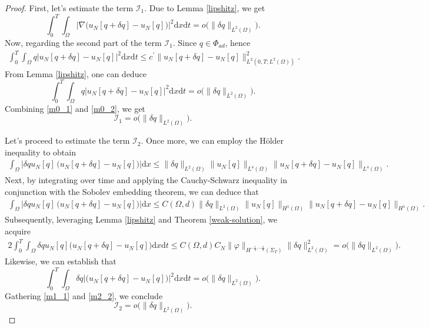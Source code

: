 \documentclass[a4paper,12pt,reqno,natbib]{amsart}
\newcommand{\dx} {\displaystyle\mathrm{d}x}
\newcommand{\dt} {\displaystyle\mathrm{d}t}
\begin{document}
{\begin{proof}
First, let's estimate the term $\mathcal{I}_1$. Due to Lemma \ref{lipshitz}, we get
%
\begin{equation} \label{m0_1}
   \int_0^T \int_{\Omega} \Big|\nabla\Big( u_N[q+\delta q]- u_N[q]\Big)\Big|^2\dx\dt
    =o\Big(\|\delta q\|_{L^2(\Omega)}\Big).
\end{equation}
Now, regarding the second part of the term $\mathcal{I}_1$. Since $q \in \Phi_{ad}$, hence
\begin{align*} 
\int_0^T\int_{\Omega} q\Big|  u_N[q+\delta q]- u_N[q]\Big|^2\dx\dt\leq  c^\prime \| u_N[q+\delta q]- u_N[q]\|^2_{L^2(0,T;L^{2}(\Omega))}.
\end{align*}
From Lemma \ref{lipshitz}, one can deduce
\begin{equation} \label{m0_2}
    \int_0^T\int_{\Omega} q\Big|  u_N[q+\delta q]- u_N[q]\Big|^2\dx\dt
    =o\Big(\|\delta q\|_{L^2(\Omega)}\Big).
\end{equation}
Combining \eqref{m0_1} and \eqref{m0_2}, we get
\begin{equation} \label{m0}
    \mathcal{I}_1
    =o\Big(\|\delta q\|_{L^2(\Omega)}\Big).
\end{equation}

Let's proceed to estimate the term $\mathcal{I}_2$. Once more, we can employ the H\"{o}lder inequality  to obtain
\begin{align*} 
\int_\Omega \Big|\delta q u_N[q]\, \Big( u_N[q+\delta q]- u_N[q]\Big)\Big|\dx\leq  \|\delta q \|_{L^{2}(\Omega)}\| u_N[q]\|_{L^{4}(\Omega)}\| u_N[q+\delta q]- u_N[q]\|_{L^{4}(\Omega)}.
\end{align*}
Next, by integrating over time and applying the Cauchy-Schwarz inequality in conjunction with the Sobolev embedding theorem, we can deduce that
\begin{align*} 
\int_\Omega \Big|\delta q u_N[q]\, \Big( u_N[q+\delta q]- u_N[q]\Big)\Big|\dx\leq C(\Omega,d) \|\delta q \|_{L^{2}(\Omega)}\| u_N[q]\|_{H^{1}(\Omega)}\| u_N[q+\delta q]- u_N[q]\|_{H^{1}(\Omega)}.
\end{align*}
Subsequently, leveraging Lemma \ref{lipshitz} and Theorem \ref{weak-solution}, we acquire
\begin{align}
    2\int_0^T\int_{\Omega} \delta q u_N[q] \Big( u_N[q+\delta q]- u_N[q]\Big) \dx\dt
    \leq C(\Omega,d)C_N \|\varphi\|_{H^{-\frac{1}{2}, -\frac{\alpha}{4} }(\Sigma_T)} \|\delta q \|_{L^{2}(\Omega)}^2 =o\Big(\|\delta q\|_{L^2(\Omega)}\Big). \label{m1_1}
\end{align}
Likewise, we can establish that
\begin{equation} \label{m2_2}
    \int_0^T\int_{\Omega} \delta q\Big| \Big( u_N[q+\delta q]- u_N[q]\Big)\Big|^2\dx\dt
    =o\Big(\|\delta q\|_{L^2(\Omega)}\Big).
\end{equation}
Gathering \eqref{m1_1} and \eqref{m2_2}, we conclude
\begin{equation} \label{m2}
    \mathcal{I}_2
    =o\Big(\|\delta q\|_{L^2(\Omega)}\Big).
\end{equation}


\end{proof}}
\end{document}
